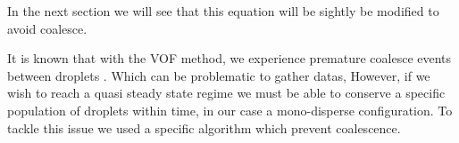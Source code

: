 In the next section we will see that this equation will be sightly be modified to avoid coalesce.

It is known that with the VOF method, we experience premature coalesce events between droplets \citet[Appendix B]{innocenti2020direct}.
Which can be problematic to gather datas,\citet{loisy2017buoyancy}
However, if we wish to reach a quasi steady state regime we must be able to conserve a specific population of droplets within time, in our case a mono-disperse configuration. 
To tackle this issue we used a specific algorithm which prevent coalescence. 


